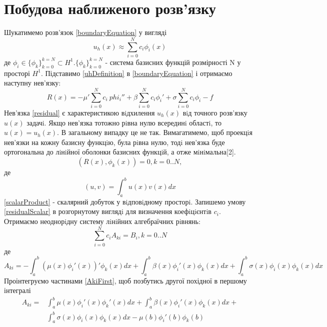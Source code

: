 \documentclass[a4paper]{article}
\numberwithin{equation}{section}
\begin{document}
\section{Побудова наближеного розв’язку}
Шукатимемо розв’язок \ref{boundaryEquation} у вигляді 
\begin{equation}\label{uhDefinition}
u_h(x)\approx\sum_{i=0}^{N} c_i\phi_i(x)
\end{equation}
де $\phi_i\in\{\phi_k\}_{k=0}^{k=N} \subset H^1. \{\phi_k\}_{k=0}^{k=N}$ - система базисних функцій розмірності N у просторі $H^1$. Підставимо \ref{uhDefinition} в \ref{boundaryEquation} і отримаємо наступну нев’язку:
\begin{equation}\label{residual}
R(x) = -\mu' \sum_{i=0}^{N} c_i\ phi_i'' + \beta \sum_{i=0}^{N} c_i \phi_i' + \sigma \sum_{i=0}^{N} c_i\phi_i - f
\end{equation}
Нев’язка \ref{residual} є характеристикою вiдхилення $u_h(x)$ вiд точного розв’язку $u(x)$ задачi. Якщо нев’язка тотожно рiвна нулю всерединi областi, то $u(x) = u_h(x)$. В загальному випадку це не так. Вимагати\-мемо, щоб проекцiя нев’язки на кожну базисну функцiю, була рiвна нулю, тодi нев’язка буде ортогональна до лiнiйної оболонки базисних функцiй, а отже мiнiмальна[2].
\begin{equation}\label{residualScalar}
(R(x), \phi_k(x)) = 0, k = 0..N,
\end{equation}
де
\begin{equation}\label{scalarProduct}
(u, v) = \int_a^b u(x)v(x)dx
\end{equation}
\ref{scalarProduct} - скалярний добуток у вiдповiдному просторi. Запишемо умову \ref{residualScalar} в розгорнутому виглядi для визначення коефiцiєнтiв $ c_i $. Отримаємо неоднорiдну систему лiнiйних алгебраїчних рiвнянь:
\begin{equation}\label{matrixEquation}
\sum_{i=0}^{N} c_iA_{ki} = B_i,  k=0..N
\end{equation}
де 
\begin{equation}\label{AkiFirst}
A_{ki} = -\int_a^b (\mu(x) \phi_i'(x))' \phi_k(x) dx + \int_a^b \beta(x) \phi_i'(x) \phi_k(x)dx + \int_a^b \sigma(x) \phi_i(x) \phi_k(x)dx
\end{equation}
Проінтегруємо частинами \ref{AkiFirst}, щоб позбутись другої похідної в першому інтегралі
\begin{equation}\label{AkiSecond}
\begin{split}
A_{ki} = & \int_a^b \mu(x) \phi_i'(x) \phi_k'(x) dx + \int_a^b \beta(x) \phi_i'(x) \phi_k(x) dx + \\& \int_a^b \sigma(x) \phi_i(x) \phi_k(x) dx - \mu(b) \phi_i'(b) \phi_k(b)
\end{split}
\end{equation}
\end{document}
